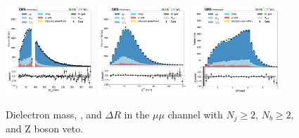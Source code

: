\begin{figure}[htb!]
    \centering
    \includegraphics[width=0.3\textwidth]{chapters/Appendix/sectionPlots/figures/data_mc_overlays/mumu_2016_cat_gt2_gt2_b_signal_linear_lepton_dilepton1_mass}
    \includegraphics[width=0.3\textwidth]{chapters/Appendix/sectionPlots/figures/data_mc_overlays/mumu_2016_cat_gt2_gt2_b_signal_linear_lepton_dilepton1_pt}
    \includegraphics[width=0.3\textwidth]{chapters/Appendix/sectionPlots/figures/data_mc_overlays/mumu_2016_cat_gt2_gt2_b_signal_linear_lepton_dilepton1_delta_r}
    \caption{Dielectron mass, \pt, and $\Delta R$ in the $\mu\mu$ channel
    with $N_{j} \geq 2$, $N_{b} \geq 2$, and Z boson veto.}
    \label{fig:mumu_2_dilepton}
\end{figure}

